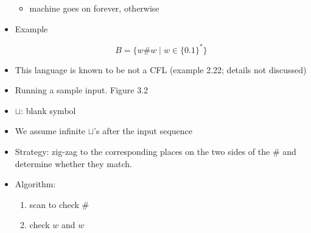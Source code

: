 \begin{frame}[allowframebreaks]
\begin{itemize}
\begin{itemize}
  \item machine goes on forever, otherwise
  \end{itemize}
\item Example

  \begin{equation*}
B=\{w\#w\mid w \in \{0.1\}^*\}
\end{equation*}
\item This language is known to be not a CFL (example 2.22; details
  not discussed)

\item Running a sample input. Figure 3.2
\item $\sqcup$: blank symbol
\item [] We assume infinite $\sqcup$'s after the input sequence
\item Strategy: zig-zag to the corresponding places on the two sides of the \# and determine
  whether they match.
  
\begin{center}
\end{center}



\item Algorithm:
  \begin{enumerate}
  \item scan to check \#
  \item check $w$ and $w$
  \end{enumerate}

\end{itemize}
\end{frame}

